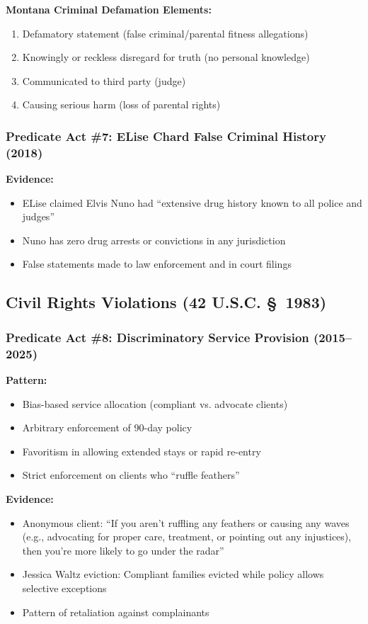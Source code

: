 \documentclass[11pt,letterpaper]{article}
\begin{document}
\textbf{Montana Criminal Defamation Elements:}
\begin{enumerate}[leftmargin=*]
\item Defamatory statement (false criminal/parental fitness allegations)
\item Knowingly or reckless disregard for truth (no personal knowledge)
\item Communicated to third party (judge)
\item Causing serious harm (loss of parental rights)
\end{enumerate}

\subsubsection{Predicate Act \#7: ELise Chard False Criminal History (2018)}

\textbf{Evidence:}
\begin{itemize}[leftmargin=*]
\item ELise claimed Elvis Nuno had ``extensive drug history known to all police and judges''
\item Nuno has zero drug arrests or convictions in any jurisdiction
\item False statements made to law enforcement and in court filings
\end{itemize}

\subsection{Civil Rights Violations (42 U.S.C. \S~1983)}

\subsubsection{Predicate Act \#8: Discriminatory Service Provision (2015--2025)}

\textbf{Pattern:}
\begin{itemize}[leftmargin=*]
\item Bias-based service allocation (compliant vs. advocate clients)
\item Arbitrary enforcement of 90-day policy
\item Favoritism in allowing extended stays or rapid re-entry
\item Strict enforcement on clients who ``ruffle feathers''
\end{itemize}

\textbf{Evidence:}
\begin{itemize}[leftmargin=*]
\item Anonymous client: ``If you aren't ruffling any feathers or causing any waves (e.g., advocating for proper care, treatment, or pointing out any injustices), then you're more likely to go under the radar''
\item Jessica Waltz eviction: Compliant families evicted while policy allows selective exceptions
\item Pattern of retaliation against complainants
\end{itemize}
\end{document}
